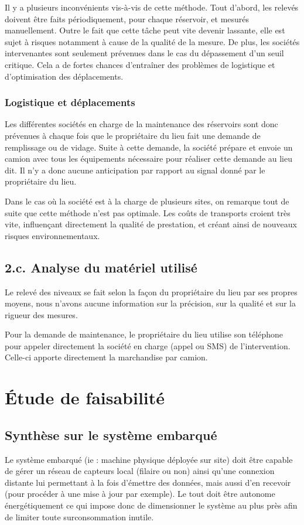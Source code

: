 \documentclass{article}
\begin{document}
Il y a plusieurs inconvénients vis-à-vis de cette méthode. Tout d’abord,
les relevés doivent être faits périodiquement, pour chaque réservoir,
et mesurés manuellement. Outre le fait que cette tâche peut vite
devenir lassante, elle est sujet à risques notamment à cause de la
qualité de la mesure. De plus, les sociétés intervenantes sont
seulement prévenues dans le cas du dépassement d’un seuil critique.
Cela a de fortes chances d'entraîner des problèmes de
logistique et d’optimisation des déplacements. 


\subsubsection{Logistique et déplacements}
Les différentes sociétés en charge de la maintenance des réservoirs sont
donc prévenues à chaque fois que le propriétaire du lieu fait une
demande de remplissage ou de vidage. Suite à cette demande, la société
prépare et envoie un camion avec tous les équipements nécessaire pour
réaliser cette demande au lieu dit.  Il n’y a donc aucune anticipation
par rapport au signal donné par le propriétaire du lieu.

Dans le cas où la société est à la charge de plusieurs sites, on
remarque tout de suite que cette méthode n’est pas optimale. Les coûts
de transports croient très vite, influençant directement la qualité de
prestation, et créant ainsi de nouveaux risques environnementaux.

\subsection{2.c. Analyse du matériel utilisé}
Le relevé des niveaux se fait selon la façon du propriétaire du lieu
par ses propres moyens, nous n’avons aucune information sur la
précision, sur la qualité et sur la rigueur des mesures.

Pour la demande de maintenance, le propriétaire du lieu utilise son
téléphone pour appeler directement la société en charge (appel ou SMS)
de l’intervention. Celle-ci apporte directement la marchandise par
camion.

\section{Étude de faisabilité}
\subsection{Synthèse sur le système embarqué}
Le système embarqué (ie : machine physique déployée sur site) doit être
capable de gérer un réseau de capteurs local (filaire ou non) ainsi
qu’une connexion distante lui permettant à la fois d’émettre des
données, mais aussi d’en recevoir (pour procéder à une mise à jour par
exemple). Le tout doit être autonome énergétiquement ce qui impose donc
de dimensionner le système au plus près afin de limiter toute
surconsommation inutile.
\end{document}
